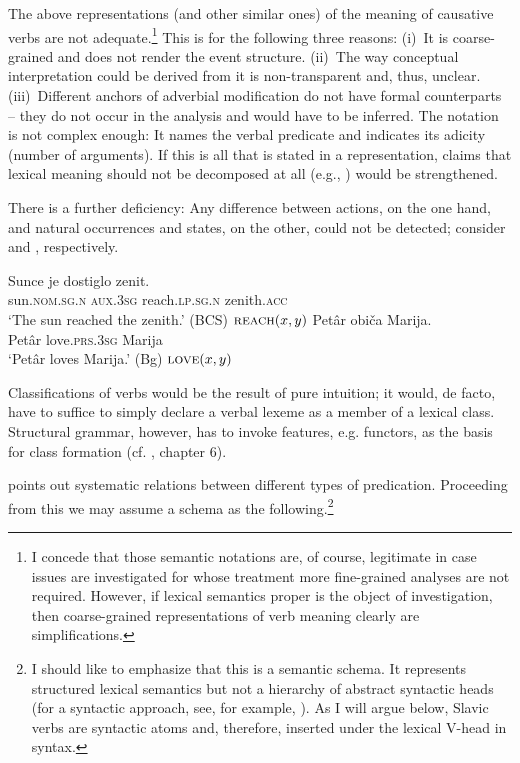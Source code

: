 \documentclass[output=paper]{langscibook}
\begin{document}
\noindent The above representations (and other similar ones) of the meaning of causative verbs are not adequate.\footnote{I concede that those semantic notations are, of course, legitimate in case issues are investigated for whose treatment more fine-grained analyses are not required. However, if lexical semantics proper is the object of investigation, then coarse-grained representations of verb meaning clearly are simplifications.} This is for the following three reasons: (i)~It is coarse-grained and does not render the event structure. (ii)~The way conceptual interpretation could be derived from it is non-transparent and, thus, unclear. (iii)~Different anchors of adverbial modification do not have formal counterparts -- they do not occur in the analysis and would have to be inferred. The notation is not complex enough: It names the verbal predicate and indicates its adicity (number of arguments). If this is all that is stated in a representation, claims that lexical meaning should not be decomposed at all (e.g., \citealt{Putnam1975}) would be strengthened.

There is a further deficiency: Any difference between actions, on the one hand, and natural occurrences and states, on the other, could not be detected; consider  and , respectively.

\ea
    \label{ex:junghanns:17}
    \ea
\gll Sunce je dostiglo zenit.\\
  sun.\textsc{nom.sg.n} \textsc{aux}.\textsc{3sg} reach.\textsc{lp.sg.n} zenith.\textsc{acc}\\
\glt   ‘The sun reached the zenith.’ \hfill (BCS)
\ex $\textsc{reach} (x, y)$
\z
\ex%
    \label{ex:junghanns:18}
     \ea
\gll Petâr običa Marija.\\
  Petâr love.\textsc{prs.3sg} Marija\\
    \glt ‘Petâr loves Marija.’ \hfill (Bg)
    \ex $\textsc{love} (x, y)$
\z
\z

\noindent Classifications of verbs would be the result of pure intuition; it would, de facto, have to suffice to simply declare a verbal lexeme as a member of a lexical class. Structural grammar, however, has to invoke features, e.g. functors, as the basis for class formation (cf. \citealt{Steube1988}, chapter 6).

 \citet[43]{Bierwisch2005} points out systematic relations between different types of predication. Proceeding from this we may assume a schema as the following.\footnote{I should like to emphasize that this is a semantic schema. It represents structured lexical semantics but not a hierarchy of abstract syntactic heads (for a syntactic approach, see, for example, \citealt{Ramchand2008}). As I will argue below, Slavic verbs are syntactic atoms and, therefore, inserted under the lexical V-head in syntax.}
\end{document}
